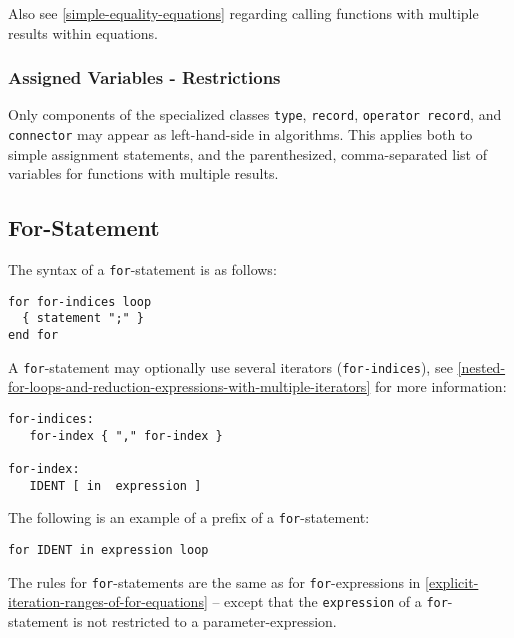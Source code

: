 \begin{nonnormative}
Also see \cref{simple-equality-equations} regarding calling functions with multiple results within equations.
\end{nonnormative}

\subsubsection{Assigned Variables - Restrictions}\label{restrictions-on-assigned-variables}\label{assigned-variables-restrictions}

Only components of the specialized classes \lstinline!type!, \lstinline!record!, \lstinline!operator record!, and \lstinline!connector! may appear as left-hand-side in algorithms.
This applies both to simple assignment statements, and the parenthesized, comma-separated list of variables for functions with multiple results.

\subsection{For-Statement}\label{for-statement}

The syntax of a \lstinline!for!-statement is as follows:
\begin{lstlisting}[language=grammar]
for for-indices loop
  { statement ";" }
end for
\end{lstlisting}
A \lstinline!for!-statement may optionally use several iterators (\lstinline!for-indices!), see \cref{nested-for-loops-and-reduction-expressions-with-multiple-iterators} for more information:
\begin{lstlisting}[language=grammar]
for-indices:
   for-index { "," for-index }

for-index:
   IDENT [ in  expression ]
\end{lstlisting}
The following is an example of a prefix of a \lstinline!for!-statement:
\begin{lstlisting}[language=modelica]
for IDENT in expression loop
\end{lstlisting}
The rules for \lstinline!for!-statements are the same as for \lstinline!for!-expressions in \cref{explicit-iteration-ranges-of-for-equations} -- except that the \lstinline!expression! of a \lstinline!for!-statement is not restricted to a parameter-expression.

